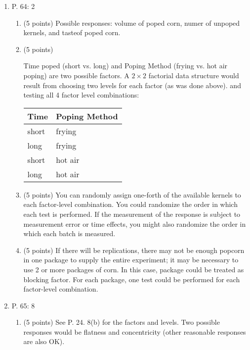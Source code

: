 \documentclass{article}
\begin{document}
\begin{enumerate}
	\item P. 64: 2 
			\begin{enumerate}
				\item (5 points)
					{\color{red} 
						Possible responses: volume of poped
					corn, numer of unpoped kernels, and
				tasteof poped corn.}
			\item (5 points)
					{\color{red} Time poped (short vs. long) and Poping
					Method (frying vs. hot air poping) are
					two possible factors. A $2 \times 2$
					factorial data structure would result
					from choosing two levels for each
					factor (as was done above). and testing
					all 4 factor level combinations:
					\begin{center}
						\begin{tabular}{ll}
						Time & Poping Method \\ \hline
						short & frying \\
						long & frying \\
						short & hot air \\
						long & hot air
						\end{tabular}
				\end{center}}
			\item (5 points)
					{\color{red} You can randomly assign one-forth of
					the available kernels to each
					factor-level combination. You could
					randomize the order in which each test
					is performed. If the measurement of the
					response is subject to measurement
					error or time effects, you might also
					randomize the order in which each batch
				is measured.}
			\item (5 points)
					{\color{red} If there will be replications, there
					may not be enough popcorn in one
					package to supply the entire
					experiment; it may be necessary to use
					2 or more packages of corn. In this
					case, package could be treated as
					blocking factor. For each package, one
					test could be performed for each
				factor-level combination.}

			\end{enumerate}
		
	\item P. 65: 8
		
			\begin{enumerate}
				\item 
					(5 points) {\color{red} 
						See P. 24. 8(b) for the factors and
					levels. Two possible responses would
					be flatness and concentricity (other
				reasonable responses are also OK).}


\end{enumerate}
\end{enumerate}
\end{document}

